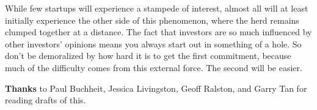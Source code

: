 While few startups will experience a stampede of interest, almost all
will at least initially experience the other side of this phenomenon,
where the herd remains clumped together at a distance. The fact that
investors are so much influenced by other investors' opinions means you
always start out in something of a hole. So don't be demoralized by how
hard it is to get the first commitment, because much of the difficulty
comes from this external force. The second will be easier.


\textbf{Thanks} to Paul Buchheit, Jessica Livingston, Geoff Ralston, and
Garry Tan for reading drafts of this.